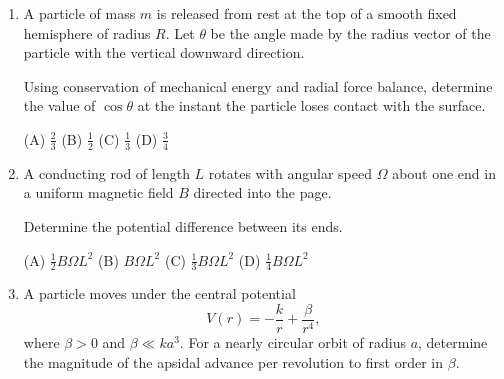 \documentclass[12pt]{article}
\begin{document}
\begin{enumerate}[label=\arabic*., leftmargin=0pt, itemindent=18pt, itemsep=1em]
(A) $\frac{mg\sin\theta\cos\theta}{M+m}$  
(B) $\frac{mg\sin\theta\cos\theta}{M+m\sin^2\theta}$  
(C) $\frac{mg\sin\theta}{M+m}$  
(D) $\frac{mg\cos\theta}{M+m}$

\item A particle of mass $m$ is released from rest at the top of a smooth fixed hemisphere of radius $R$. Let $\theta$ be the angle made by the radius vector of the particle with the vertical downward direction.

Using conservation of mechanical energy and radial force balance, determine the value of $\cos\theta$ at the instant the particle loses contact with the surface.

\begin{center}
\end{center}

(A) $\frac{2}{3}$  
(B) $\frac{1}{2}$  
(C) $\frac{1}{3}$  
(D) $\frac{3}{4}$

\item A conducting rod of length $L$ rotates with angular speed $\Omega$ about one end in a uniform magnetic field $B$ directed into the page.

Determine the potential difference between its ends.

\begin{center}
\end{center}

(A) $\frac{1}{2}B\Omega L^2$  
(B) $B\Omega L^2$  
(C) $\frac{1}{3}B\Omega L^2$  
(D) $\frac{1}{4}B\Omega L^2$

\item A particle moves under the central potential
\[
V(r) = -\frac{k}{r} + \frac{\beta}{r^4},
\]
where $\beta>0$ and $\beta \ll k a^3$. For a nearly circular orbit of radius $a$, determine the magnitude of the apsidal advance per revolution to first order in $\beta$.


\end{enumerate}
\end{document}
